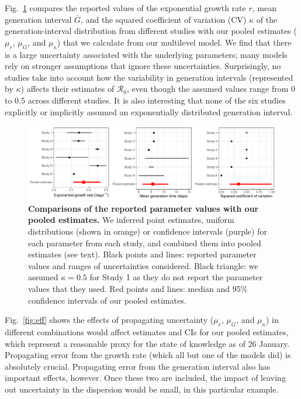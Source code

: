 \documentclass[12pt]{article}
\newcommand{\fref}[1]{Fig.~\ref{fig:#1}}
\begin{document}
\fref{assumption} compares the reported values of the exponential growth rate $r$, mean generation interval $\bar G$, and the squared coefficient of variation (CV) $\kappa$ of the generation-interval distribution from different studies with our pooled estimates ($\mu_r$, $\mu_G$, and $\mu_\kappa$) that we calculate from our multilevel model.
We find that there is a large uncertainty associated with the underlying parameters;
many models rely on stronger assumptions that ignore these uncertainties.
Surprisingly, no studies take into account how the variability in generation intervals (represented by $\kappa$) affects their estimates of $\mathcal R_0$, even though the assumed values range from 0 to 0.5 across different studies.
It is also interesting that none of the six studies explicitly or implicitly assumed an exponentially distributed generation interval.

\begin{figure}[t]
\includegraphics[width=\textwidth]{compare_assumption.pdf}
\caption{
\textbf{Comparisons of the reported parameter values with our pooled estimates.}
We inferred point estimates, uniform distributions (shown in orange) or confidence intervals (purple) for each parameter from each study, and combined them into pooled estimates (see text).
Black points and lines: reported parameter values and ranges of uncertainties considered.
Black triangle: we assumed $\kappa=0.5$ for Study 1 as they do not report the parameter values that they used.
Red points and lines: median and 95\% confidence intervals of our pooled estimates.
}
\label{fig:assumption}
\end{figure}

\fref{eff} shows the effects of propagating uncertainty ($\mu_r$, $\mu_G$, and $\mu_\kappa$) in different combinations would affect estimates and CIs for our pooled estimates, which represent a reasonable proxy for the state of knowledge as of 26 January. 
Propagating error from the growth rate (which all but one of the models did) is absolutely crucial. 
Propagating error from the generation interval also has important effects, however.
Once these two are included, the impact of leaving out uncertainty in the dispersion would be small, in this particular example.
\end{document}
